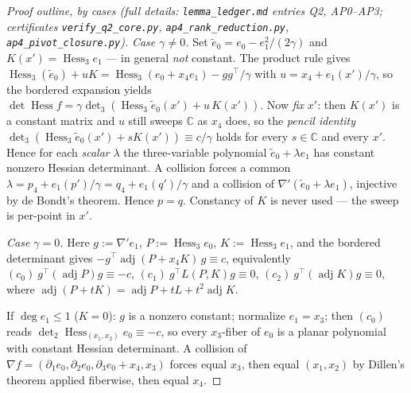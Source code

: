 \documentclass[11pt]{article}
\theoremstyle{plain}
\theoremstyle{definition}
\newcommand{\C}{\mathbb{C}}
\newcommand{\Hess}{\operatorname{Hess}}
\newcommand{\adj}{\operatorname{adj}}
\begin{document}
\begin{proof}[Proof outline, by cases (full details:
\texttt{lemma\_ledger.md} entries Q2, AP0--AP3; certificates
\texttt{verify\_q2\_core.py}, \texttt{ap4\_rank\_reduction.py},
\texttt{ap4\_pivot\_closure.py})]
\emph{Case $\gamma\ne0$.} Set $\tilde e_0=e_0-e_1^2/(2\gamma)$ and
$K(x')=\Hess_3e_1$ --- in general \emph{not} constant. The product rule
gives $\Hess_3(\tilde e_0)+uK=\Hess_3(e_0+x_4e_1)-gg^\top/\gamma$ with
$u=x_4+e_1(x')/\gamma$, so the bordered expansion yields
$\det\Hess f=\gamma\det_3(\Hess_3\tilde e_0(x')+u\,K(x'))$. Now
\emph{fix} $x'$: then $K(x')$ is a constant matrix and $u$ still sweeps
$\C$ as $x_4$ does, so the \emph{pencil identity}
$\det_3(\Hess_3\tilde e_0(x')+sK(x'))\equiv c/\gamma$ holds for every
$s\in\C$ and every $x'$. Hence for each \emph{scalar} $\lambda$ the
three-variable polynomial $\tilde e_0+\lambda e_1$ has constant nonzero
Hessian determinant. A collision forces a common
$\lambda=p_4+e_1(p')/\gamma=q_4+e_1(q')/\gamma$ and a collision of
$\nabla'(\tilde e_0+\lambda e_1)$, injective by de Bondt's theorem. Hence
$p=q$. Constancy of $K$ is never used --- the sweep is per-point in $x'$.

\emph{Case $\gamma=0$.} Here $g:=\nabla'e_1$, $P:=\Hess_3e_0$,
$K:=\Hess_3e_1$, and the bordered determinant gives
$-g^\top\adj(P+x_4K)\,g\equiv c$, equivalently
$(c_0)\ g^\top(\adj P)g\equiv-c$, $(c_1)\ g^\top L(P,K)g\equiv0$,
$(c_2)\ g^\top(\adj K)g\equiv0$, where
$\adj(P+tK)=\adj P+tL+t^2\adj K$.

If $\deg e_1\le1$ ($K=0$): $g$ is a nonzero constant; normalize $e_1=x_3$;
then $(c_0)$ reads $\det_2\Hess_{(x_1,x_2)}e_0\equiv-c$, so every
$x_3$-fiber of $e_0$ is a planar polynomial with constant Hessian
determinant. A collision of
$\nabla f=(\partial_1e_0,\partial_2e_0,\partial_3e_0+x_4,x_3)$ forces
equal $x_3$, then equal $(x_1,x_2)$ by Dillen's theorem applied fiberwise,
then equal $x_4$.


\end{proof}
\end{document}
